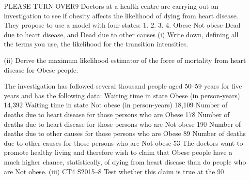 
PLEASE TURN OVER9
Doctors at a health centre are carrying out an investigation to see if obesity affects the
likelihood of dying from heart disease. They propose to use a model with four states:
1.
2.
3.
4.
Obese
Not obese
Dead due to heart disease, and
Dead due to other causes
(i) Write down, defining all the terms you use, the likelihood for the transition
intensities.

(ii) Derive the maximum likelihood estimator of the force of mortality from heart
disease for Obese people.

The investigation has followed several thousand people aged 50–59 years for five
years and has the following data:
Waiting time in state Obese (in person-years)
14,392
Waiting time in state Not obese (in person-years)
18,109
Number of deaths due to heart disease for those persons who are Obese
178
Number of deaths due to heart disease for those persons who are Not obese
190
Number of deaths due to other causes for those persons who are Obese
89
Number of deaths due to other causes for those persons who are Not obese
53
The doctors want to promote healthy living and therefore wish to claim that Obese
people have a much higher chance, statistically, of dying from heart disease than do
people who are Not obese.
(iii)
CT4 S2015–8
Test whether this claim is true at the 90%

